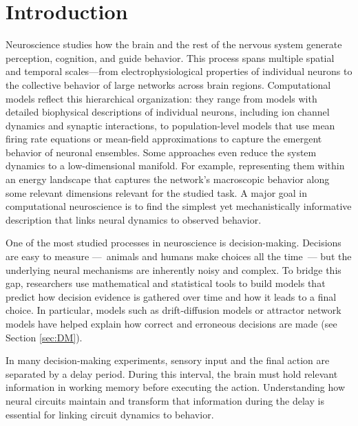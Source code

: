 \documentclass[12,twoside]{TFG-GM}
\theoremstyle{definition}
\theoremstyle{remark}
\begin{document}

\maketitle

\tableofcontents    
\newpage 

\section{Introduction}
Neuroscience studies how the brain and the rest of the nervous system generate perception, cognition, and guide behavior. This process spans multiple spatial and temporal scales—from electrophysiological properties of individual neurons to the collective behavior of large networks across brain regions. Computational models reflect this hierarchical organization: they range from models with detailed biophysical descriptions of individual neurons,  including ion channel dynamics and synaptic interactions, to population-level models that use mean firing rate equations or mean-field approximations to capture the emergent behavior of neuronal ensembles. Some approaches even reduce the system dynamics to a low-dimensional manifold. For example, representing them within an energy landscape that captures the network’s macroscopic behavior along some relevant dimensions relevant for the studied task. A major goal in computational neuroscience is to find the simplest yet mechanistically informative description that links neural dynamics to observed behavior.


One of the most studied processes in neuroscience is decision-making. Decisions are easy to measure —~animals and humans make choices all the time~— but the underlying neural mechanisms are inherently noisy and complex. To bridge this gap, researchers use mathematical and statistical tools to build models that predict how decision evidence is gathered over time and how it leads to a final choice. In particular, models such as drift‐diffusion models \cite{ratcliff2016, hanks2017} or attractor network models have helped explain how correct and erroneous decisions are made \cite{hopfield1982} (see Section \ref{sec:DM}).

In many decision-making experiments, sensory input and the final action are separated by a delay period. During this interval, the brain must hold relevant information in working memory before executing the action. Understanding how neural circuits maintain and transform that information during the delay is essential for linking circuit dynamics to behavior.
\end{document}
